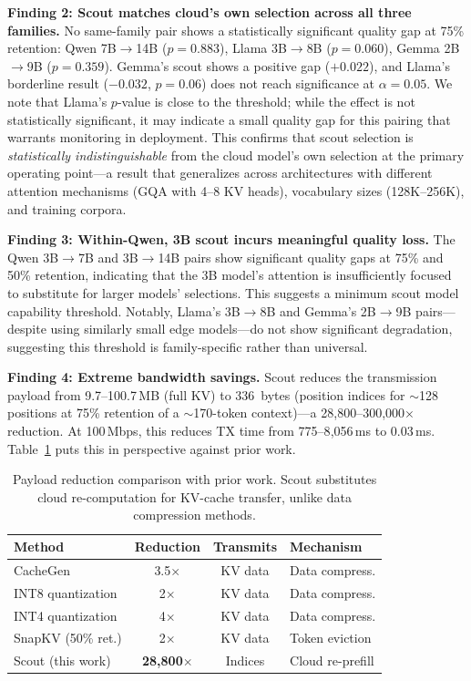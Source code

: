 \documentclass[journal]{IEEEtran}
\begin{document}
\textbf{Finding 2: Scout matches cloud's own selection across all three families.}
No same-family pair shows a statistically significant quality gap at 75\% retention: Qwen 7B$\to$14B ($p = 0.883$), Llama 3B$\to$8B ($p = 0.060$), Gemma 2B$\to$9B ($p = 0.359$).
Gemma's scout shows a positive gap ($+0.022$), and Llama's borderline result ($-0.032$, $p = 0.06$) does not reach significance at $\alpha = 0.05$.
We note that Llama's $p$-value is close to the threshold; while the effect is not statistically significant, it may indicate a small quality gap for this pairing that warrants monitoring in deployment.
This confirms that scout selection is \emph{statistically indistinguishable} from the cloud model's own selection at the primary operating point---a result that generalizes across architectures with different attention mechanisms (GQA with 4--8 KV heads), vocabulary sizes (128K--256K), and training corpora.

\textbf{Finding 3: Within-Qwen, 3B scout incurs meaningful quality loss.}
The Qwen 3B$\to$7B and 3B$\to$14B pairs show significant quality gaps at 75\% and 50\% retention, indicating that the 3B model's attention is insufficiently focused to substitute for larger models' selections.
This suggests a minimum scout model capability threshold.
Notably, Llama's 3B$\to$8B and Gemma's 2B$\to$9B pairs---despite using similarly small edge models---do not show significant degradation, suggesting this threshold is family-specific rather than universal.

\textbf{Finding 4: Extreme bandwidth savings.}
Scout reduces the transmission payload from 9.7--100.7\,MB (full KV) to 336~bytes (position indices for $\sim$128 positions at 75\% retention of a $\sim$170-token context)---a 28{,}800--300{,}000$\times$ reduction.
At 100\,Mbps, this reduces TX time from 775--8{,}056\,ms to 0.03\,ms.
Table~\ref{tab:compression_comparison} puts this in perspective against prior work.

\begin{table}[t]
\centering
\caption{Payload reduction comparison with prior work. Scout substitutes cloud re-computation for KV-cache transfer, unlike data compression methods.}
\label{tab:compression_comparison}
\small
\begin{tabular}{@{}lccl@{}}
\toprule
\textbf{Method} & \textbf{Reduction} & \textbf{Transmits} & \textbf{Mechanism} \\
\midrule
CacheGen~\cite{cachegen}  & 3.5$\times$  & KV data  & Data compress. \\
INT8 quantization          & 2$\times$    & KV data  & Data compress. \\
INT4 quantization          & 4$\times$    & KV data  & Data compress. \\
SnapKV (50\% ret.)         & 2$\times$    & KV data  & Token eviction \\
Scout (this work)          & \textbf{28,800}$\times$ & Indices & Cloud re-prefill \\
\bottomrule
\end{tabular}
\end{table}
\end{document}
